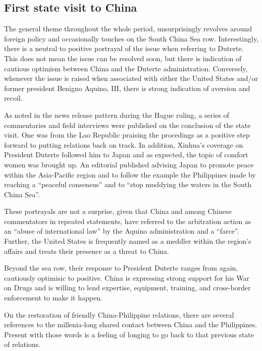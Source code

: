 \subsection{First state visit to China}

The general theme throughout the whole period, unsurprisingly revolves
around foreign policy and occasionally touches on the South China Sea
row. Interestingly, there is a neutral to positive portrayal of the
issue when referring to Duterte. This does not mean the issue can be
resolved soon, but there is indication of cautious optimism between
China and the Duterte administration. Conversely, whenever the issue is
raised when associated with either the United States and/or former
president Benigno Aquino, III, there is strong indication of aversion
and recoil.

As noted in the news release pattern during the Hague ruling, a series
of commentaries and field interviews were published on the conclusion
of the state visit. One was from the Lao Republic praising the
procedings as a positive step forward to putting relations back on
track. In addition, Xinhua's coverage on President Duterte followed him
to Japan and as expected, the topic of comfort women was brought up.
An editorial published advising Japan to promote peace within the
Asia-Pacific region and to follow the example the Philippines made by
reaching a ``peaceful consensus'' and to ``stop muddying the waters in
the South China Sea''\autocite{chen_commentary_2016}.

These portrayals are not a surprise, given that China and among Chinese
commentators in repeated statements, have referred to the arbitration
action as an ``abuse of international law'' by the Aquino administration
and a
``farce''\autocites{sun_new_philippine_president_ties_2016}{li_end_scs_farce_2016}{xinhua_us_cold_war_not_solution_2016}.
Further, the United States is frequently named as a meddler within the
region's affairs and treats their presence as a threat to China.

Beyond the sea row, their response to President Duterte ranges from
again, cautiously optimisic to positive. China is expressing strong
support for his War on Drugs and is willing to lend expertise,
equipment, training, and cross-border enforcement to make it happen.

On the restoration of friendly China-Philippine relations, there are
several references to the millenia-long shared contact between China and
the Philippines. Present with those words is a feeling of longing to go
back to that previous state of relations.

